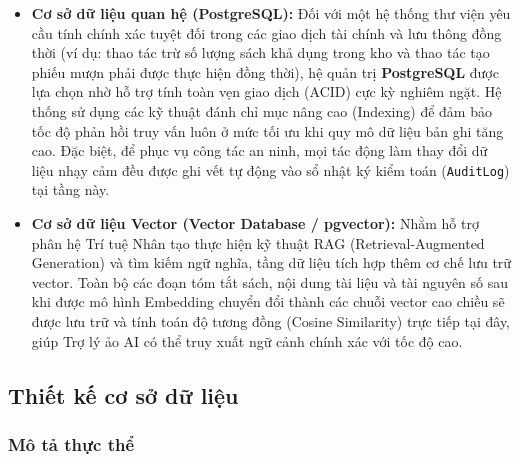 \begin{itemize}
    \item \textbf{Cơ sở dữ liệu quan hệ (PostgreSQL):} Đối với một hệ thống thư viện yêu cầu tính chính xác tuyệt đối trong các giao dịch tài chính và lưu thông đồng thời (ví dụ: thao tác trừ số lượng sách khả dụng trong kho và thao tác tạo phiếu mượn phải được thực hiện đồng thời), hệ quản trị \textbf{PostgreSQL} được lựa chọn nhờ hỗ trợ tính toàn vẹn giao dịch (ACID) cực kỳ nghiêm ngặt. Hệ thống sử dụng các kỹ thuật đánh chỉ mục nâng cao (Indexing) để đảm bảo tốc độ phản hồi truy vấn luôn ở mức tối ưu khi quy mô dữ liệu bản ghi tăng cao. Đặc biệt, để phục vụ công tác an ninh, mọi tác động làm thay đổi dữ liệu nhạy cảm đều được ghi vết tự động vào sổ nhật ký kiểm toán (\texttt{AuditLog}) tại tầng này.
    
    \item \textbf{Cơ sở dữ liệu Vector (Vector Database / pgvector):} Nhằm hỗ trợ phân hệ Trí tuệ Nhân tạo thực hiện kỹ thuật RAG (Retrieval-Augmented Generation) và tìm kiếm ngữ nghĩa, tầng dữ liệu tích hợp thêm cơ chế lưu trữ vector. Toàn bộ các đoạn tóm tắt sách, nội dung tài liệu và tài nguyên số sau khi được mô hình Embedding chuyển đổi thành các chuỗi vector cao chiều sẽ được lưu trữ và tính toán độ tương đồng (Cosine Similarity) trực tiếp tại đây, giúp Trợ lý ảo AI có thể truy xuất ngữ cảnh chính xác với tốc độ cao.
\end{itemize}

\subsection{Thiết kế cơ sở dữ liệu}
\subsubsection{Mô tả thực thể}

